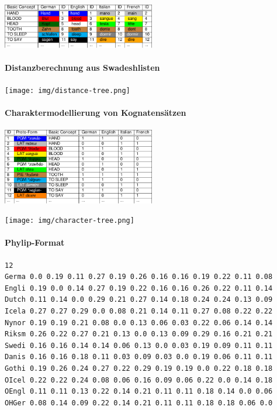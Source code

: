 \begin{center}
\includegraphics[width=0.5\textwidth]{img/cognates-1.pdf}
\end{center}




\paragraph{Distanzberechnung aus Swadeshlisten}

\begin{center}
\texttt{[image: img/distance-tree.png]}
\end{center}




\paragraph{Charaktermodellierung von Kognatensätzen}
\begin{center}
\includegraphics[width=0.5\textwidth]{img/cognates-2.pdf}
\end{center}




\begin{center}
\texttt{[image: img/character-tree.png]}
\end{center}




\paragraph{Phylip-Format}

\begin{verbatim}
12
Germa 0.0 0.19 0.11 0.27 0.19 0.26 0.16 0.16 0.19 0.22 0.11 0.08
Engli 0.19 0.0 0.14 0.27 0.19 0.22 0.16 0.16 0.26 0.22 0.11 0.14
Dutch 0.11 0.14 0.0 0.29 0.21 0.27 0.14 0.18 0.24 0.24 0.13 0.09
Icela 0.27 0.27 0.29 0.0 0.08 0.21 0.14 0.11 0.27 0.08 0.22 0.22
Nynor 0.19 0.19 0.21 0.08 0.0 0.13 0.06 0.03 0.22 0.06 0.14 0.14
Riksm 0.26 0.22 0.27 0.21 0.13 0.0 0.13 0.09 0.29 0.16 0.21 0.21
Swedi 0.16 0.16 0.14 0.14 0.06 0.13 0.0 0.03 0.19 0.09 0.11 0.11
Danis 0.16 0.16 0.18 0.11 0.03 0.09 0.03 0.0 0.19 0.06 0.11 0.11
Gothi 0.19 0.26 0.24 0.27 0.22 0.29 0.19 0.19 0.0 0.22 0.18 0.18
OIcel 0.22 0.22 0.24 0.08 0.06 0.16 0.09 0.06 0.22 0.0 0.14 0.18
OEngl 0.11 0.11 0.13 0.22 0.14 0.21 0.11 0.11 0.18 0.14 0.0 0.06
OHGer 0.08 0.14 0.09 0.22 0.14 0.21 0.11 0.11 0.18 0.18 0.06 0.0
\end{verbatim}





